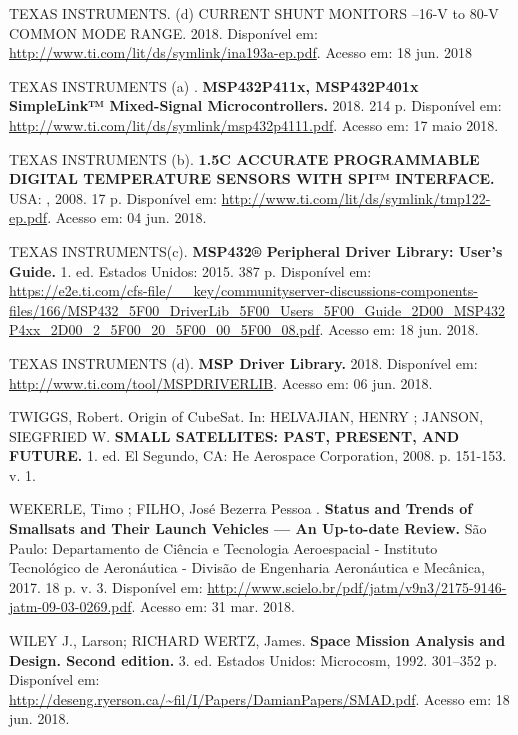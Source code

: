 \noindent TEXAS INSTRUMENTS. (d) CURRENT SHUNT MONITORS –16-V to 80-V COMMON MODE RANGE. 2018. Disponível em: \url{http://www.ti.com/lit/ds/symlink/ina193a-ep.pdf}. Acesso em: 18 jun. 2018

\noindent TEXAS INSTRUMENTS (a) . \textbf{MSP432P411x, MSP432P401x SimpleLink™ Mixed-Signal Microcontrollers.} 2018. 214 p. Disponível em: \url{http://www.ti.com/lit/ds/symlink/msp432p4111.pdf}. Acesso em: 17 maio 2018.

\noindent TEXAS INSTRUMENTS (b). \textbf{1.5C ACCURATE PROGRAMMABLE DIGITAL TEMPERATURE SENSORS WITH SPI™ INTERFACE. } USA: , 2008. 17 p. Disponível em: \url{http://www.ti.com/lit/ds/symlink/tmp122-ep.pdf}. Acesso em: 04 jun. 2018.

\noindent TEXAS INSTRUMENTS(c). \textbf{MSP432® Peripheral Driver Library: User’s Guide.} 1. ed. Estados Unidos: 2015. 387 p. Disponível em: \url{https://e2e.ti.com/cfs-file/__key/communityserver-discussions-components-files/166/MSP432_5F00_DriverLib_5F00_Users_5F00_Guide_2D00_MSP432P4xx_2D00_2_5F00_20_5F00_00_5F00_08.pdf}. Acesso em: 18 jun. 2018.

\noindent TEXAS INSTRUMENTS (d). \textbf{MSP Driver Library.} 2018. Disponível em: \url{http://www.ti.com/tool/MSPDRIVERLIB}. Acesso em: 06 jun. 2018.

\noindent TWIGGS, Robert. Origin of CubeSat. In: HELVAJIAN, HENRY ; JANSON, SIEGFRIED W. \textbf{SMALL SATELLITES: PAST, PRESENT, AND FUTURE. } 1. ed. El Segundo, CA: He Aerospace Corporation, 2008. p. 151-153. v. 1.

\noindent WEKERLE, Timo ; FILHO, José Bezerra Pessoa . \textbf{Status and Trends of Smallsats and Their Launch Vehicles — An Up-to-date Review. } São Paulo: Departamento de Ciência e Tecnologia Aeroespacial - Instituto Tecnológico de Aeronáutica - Divisão de Engenharia Aeronáutica e Mecânica, 2017. 18 p. v. 3. Disponível em: \url{http://www.scielo.br/pdf/jatm/v9n3/2175-9146-jatm-09-03-0269.pdf}. Acesso em: 31 mar. 2018.

\noindent WILEY J., Larson; RICHARD WERTZ, James. \textbf{Space Mission Analysis and Design. Second edition. } 3. ed. Estados Unidos: Microcosm, 1992. 301–352 p. Disponível em: \url{http://deseng.ryerson.ca/~fil/I/Papers/DamianPapers/SMAD.pdf}. Acesso em: 18 jun. 2018.
